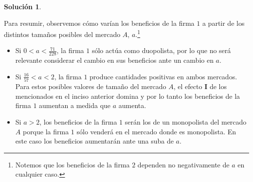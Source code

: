 \documentclass[a4paper, 11pt]{article}
\theoremstyle{definition}
\newtheorem{solucion}{Soluci\'on}
\begin{document}
\begin{solucion}
\begin{enumerate}[label=(\alph*)]
\begin{enumerate}[label=\roman*.]
Para resumir, observemos cómo varían los beneficios de la firma $1$ a partir de los distintos tamaños posibles del mercado $A$, $a$.\footnote{Notemos que los beneficios de la firma $2$ dependen no negativamente de $a$ en cualquier caso.}
 \begin{itemize}
\item Si $0<a<\frac{71}{228}$, la firma $1$ sólo actúa como duopolista, por lo que no será relevante considerar el cambio en sus beneficios ante un cambio en $a$. 
\item Si $\frac{16}{57}<a<2$, la firma $1$ produce cantidades positivas en ambos mercados. Para estos posibles valores de tamaño del mercado $A$, el efecto \textbf{I} de los mencionados en el inciso anterior domina y por lo tanto los beneficios de la firma $1$ aumentan a medida que $a$ aumenta. 
\item Si $a>2$, los beneficios de la firma $1$ serán los de un monopolista del mercado $A$ porque la firma $1$ sólo venderá en el mercado donde es monopolista. En este caso los beneficios aumentarán ante una suba de $a$.
\end{itemize}
 \end{enumerate}
 \end{enumerate}

\end{solucion}
\end{document}
